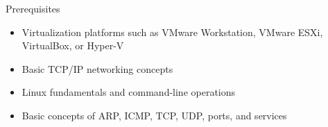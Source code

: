 \begin{frame}[t]{Prerequisites}
  \begin{itemize}
    \setlength{\itemsep}{0.14cm}
    \item Virtualization platforms such as VMware Workstation, VMware ESXi, VirtualBox, or Hyper-V
    \item Basic TCP/IP networking concepts
    \item Linux fundamentals and command-line operations
    \item Basic concepts of ARP, ICMP, TCP, UDP, ports, and services
  \end{itemize}
\end{frame}
